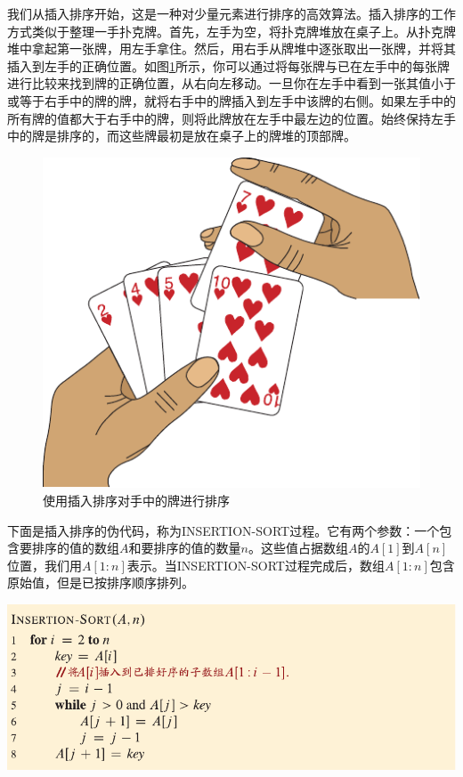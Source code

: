 \documentclass[lang=cn,newtx,10pt,scheme=chinese]{elegantbook}
\begin{document}
我们从插入排序开始，这是一种对少量元素进行排序的高效算法。插入排序的工作方式类似于整理一手扑克牌。首先，左手为空，将扑克牌堆放在桌子上。从扑克牌堆中拿起第一张牌，用左手拿住。然后，用右手从牌堆中逐张取出一张牌，并将其插入到左手的正确位置。如图\ref{fig:使用插入排序对手中的牌进行排序}所示，你可以通过将每张牌与已在左手中的每张牌进行比较来找到牌的正确位置，从右向左移动。一旦你在左手中看到一张其值小于或等于右手中的牌的牌，就将右手中的牌插入到左手中该牌的右侧。如果左手中的所有牌的值都大于右手中的牌，则将此牌放在左手中最左边的位置。始终保持左手中的牌是排序的，而这些牌最初是放在桌子上的牌堆的顶部牌。

\begin{figure}[htbp]
    \centering
    \includegraphics{算法导论第四版插图/第二章/插入排序打牌示意图.pdf}
    \caption{使用插入排序对手中的牌进行排序}
    \label{fig:使用插入排序对手中的牌进行排序}
\end{figure}

下面是插入排序的伪代码，称为INSERTION-SORT过程。它有两个参数：一个包含要排序的值的数组$A$和要排序的值的数量$n$。这些值占据数组$A$的$A[1]$到$A[n]$位置，我们用$A[1:n]$表示。当INSERTION-SORT过程完成后，数组$A[1:n]$包含原始值，但是已按排序顺序排列。

\includegraphics{算法导论第四版插图/第二章/插入排序伪代码.pdf}
\end{document}
